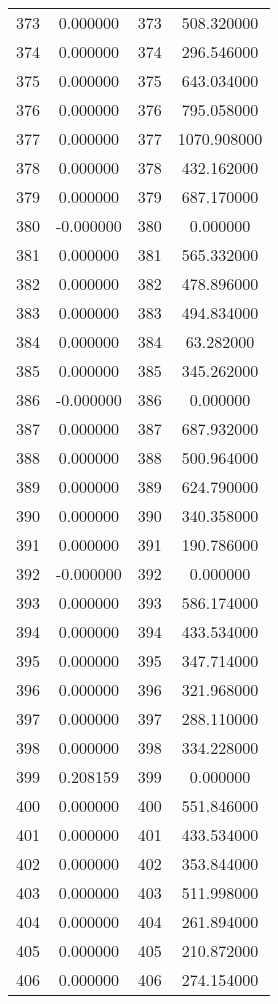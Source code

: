 \documentclass[12pt]{article}
\begin{document}
\begin{longtable}{@{}cccc@{}}
373 & 0.000000 & 373 & 508.320000 \\
374 & 0.000000 & 374 & 296.546000 \\
375 & 0.000000 & 375 & 643.034000 \\
376 & 0.000000 & 376 & 795.058000 \\
377 & 0.000000 & 377 & 1070.908000 \\
378 & 0.000000 & 378 & 432.162000 \\
379 & 0.000000 & 379 & 687.170000 \\
380 & -0.000000 & 380 & 0.000000 \\
381 & 0.000000 & 381 & 565.332000 \\
382 & 0.000000 & 382 & 478.896000 \\
383 & 0.000000 & 383 & 494.834000 \\
384 & 0.000000 & 384 & 63.282000 \\
385 & 0.000000 & 385 & 345.262000 \\
386 & -0.000000 & 386 & 0.000000 \\
387 & 0.000000 & 387 & 687.932000 \\
388 & 0.000000 & 388 & 500.964000 \\
389 & 0.000000 & 389 & 624.790000 \\
390 & 0.000000 & 390 & 340.358000 \\
391 & 0.000000 & 391 & 190.786000 \\
392 & -0.000000 & 392 & 0.000000 \\
393 & 0.000000 & 393 & 586.174000 \\
394 & 0.000000 & 394 & 433.534000 \\
395 & 0.000000 & 395 & 347.714000 \\
396 & 0.000000 & 396 & 321.968000 \\
397 & 0.000000 & 397 & 288.110000 \\
398 & 0.000000 & 398 & 334.228000 \\
399 & 0.208159 & 399 & 0.000000 \\
400 & 0.000000 & 400 & 551.846000 \\
401 & 0.000000 & 401 & 433.534000 \\
402 & 0.000000 & 402 & 353.844000 \\
403 & 0.000000 & 403 & 511.998000 \\
404 & 0.000000 & 404 & 261.894000 \\
405 & 0.000000 & 405 & 210.872000 \\
406 & 0.000000 & 406 & 274.154000 \\

\end{longtable}
\end{document}
